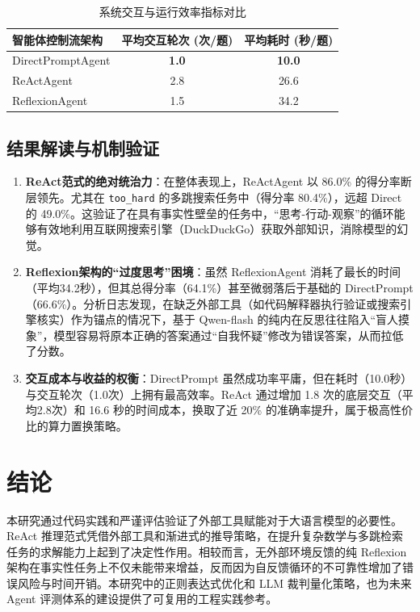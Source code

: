 \documentclass[11pt,a4paper]{ctexart}
\begin{document}
\begin{table}[H]
    \centering
    \caption{系统交互与运行效率指标对比}
    \vspace{0.2cm}
    \begin{tabular}{lcc}
        \toprule
        \textbf{智能体控制流架构} & \textbf{平均交互轮次 (次/题)} & \textbf{平均耗时 (秒/题)} \\
        \midrule
        DirectPromptAgent & \textbf{1.0} & \textbf{10.0} \\
        ReActAgent & 2.8 & 26.6 \\
        ReflexionAgent & 1.5 & 34.2 \\
        \bottomrule
    \end{tabular}
\end{table}


\subsection{结果解读与机制验证}
\begin{enumerate}
    \item \textbf{ReAct范式的绝对统治力}：在整体表现上，ReActAgent 以 86.0\% 的得分率断层领先。尤其在 \verb|too_hard| 的多跳搜索任务中（得分率 80.4\%），远超 Direct 的 49.0\%。这验证了在具有事实性壁垒的任务中，“思考-行动-观察”的循环能够有效地利用互联网搜索引擎（DuckDuckGo）获取外部知识，消除模型的幻觉。
    \item \textbf{Reflexion架构的“过度思考”困境}：虽然 ReflexionAgent 消耗了最长的时间（平均34.2秒），但其总得分率（64.1\%）甚至微弱落后于基础的 DirectPrompt（66.6\%）。分析日志发现，在缺乏外部工具（如代码解释器执行验证或搜索引擎核实）作为锚点的情况下，基于 Qwen-flash 的纯内在反思往往陷入“盲人摸象”，模型容易将原本正确的答案通过“自我怀疑”修改为错误答案，从而拉低了分数。
    \item \textbf{交互成本与收益的权衡}：DirectPrompt 虽然成功率平庸，但在耗时（10.0秒）与交互轮次（1.0次）上拥有最高效率。ReAct 通过增加 1.8 次的底层交互（平均2.8次）和 16.6 秒的时间成本，换取了近 20\% 的准确率提升，属于极高性价比的算力置换策略。
\end{enumerate}

\section{结论}
本研究通过代码实践和严谨评估验证了外部工具赋能对于大语言模型的必要性。ReAct 推理范式凭借外部工具和渐进式的推导策略，在提升复杂数学与多跳检索任务的求解能力上起到了决定性作用。相较而言，无外部环境反馈的纯 Reflexion 架构在事实性任务上不仅未能带来增益，反而因为自反馈循环的不可靠性增加了错误风险与时间开销。本研究中的正则表达式优化和 LLM 裁判量化策略，也为未来 Agent 评测体系的建设提供了可复用的工程实践参考。
\end{document}
